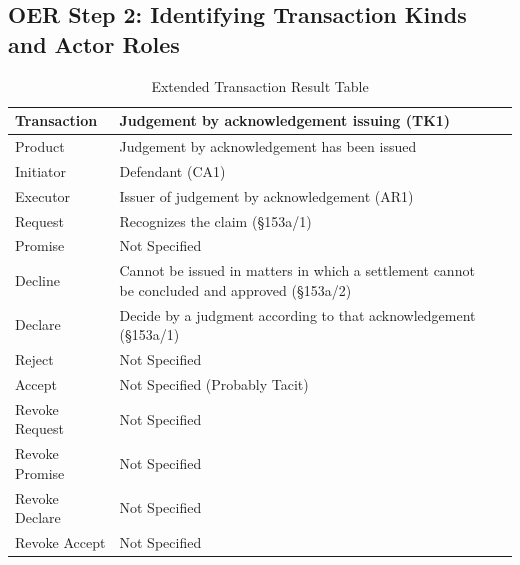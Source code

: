\begin{landscape}
\section{OER Step 2: Identifying Transaction Kinds and Actor Roles}

\begin{table}[h]
\caption{Extended Transaction Result Table}
\label{tab:etrt}
\begin{tabular}{|l||l|l|}
\hline
Transaction  & Judgement by acknowledgement issuing (TK1) \\ \hline
Product      & Judgement by acknowledgement has been issued   \\ \hline
Initiator      & Defendant (CA1) \\ \hline
Executor       & Issuer of judgement by acknowledgement (AR1)      \\ \hline
Request        & Recognizes the claim (\S153a/1)   \\ \hline
Promise        & Not Specified   \\ \hline
Decline        &  Cannot be issued in matters in which a settlement cannot be concluded and approved  (\S153a/2)  \\ \hline
Declare        & Decide by a judgment according to that acknowledgement (\S153a/1)  \\ \hline
Reject         &  Not Specified   \\ \hline
Accept         & Not Specified (Probably Tacit) \\ \hline
Revoke Request & Not Specified \\ \hline
Revoke Promise & Not Specified \\ \hline
Revoke Declare & Not Specified  \\ \hline
Revoke Accept  &  Not Specified   \\ \hline
\end{tabular}
\end{table}


\end{landscape}

